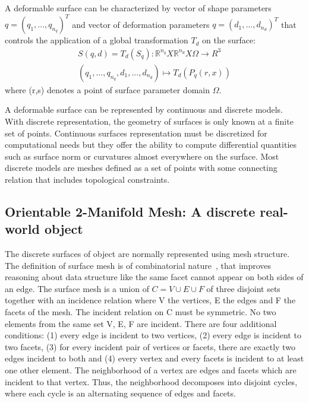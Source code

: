 \documentclass{InsightArticle}
\begin{document}
A deformable surface can be characterized by vector of shape parameters $q = ( q_1, ... , q_{n_q})^T$ and vector of deformation parameters $q = ( d_1, ... , d_{n_d})^T$ that controls the application of a global transformation $T_d$ 
on the surface:
\begin{equation}
\begin{split}
	S(q,d) = T_d(S_q) : \mathbb{R}^{n_q} X \mathbb{R}^{n_d} X \Omega \longrightarrow R^3 \\	
	(q_1, ... , q_{n_q}, d_1, ... , d_{n_d} ) \longmapsto T_d(P_q(r,x))	\end{split}
\end{equation}
where (r,s) denotes a point of surface parameter domain $\Omega$.

A deformable surface can be represented by continuous and discrete models. With discrete representation, the geometry of surfaces is only known at a finite set of points. Continuous surfaces representation must be discretized for computational needs but they offer the ability to compute differential quantities such as surface norm or curvatures almost everywhere on the surface. Most discrete models are meshes defined as a set of points with some connecting relation that includes topological constraints. 
\subsection{Orientable 2-Manifold Mesh: A discrete real-world object}
The discrete surfaces of object are normally represented using mesh structure. The definition of surface mesh is of combinatorial nature~\cite{Kettner1999}, that improves reasoning about data structure like the same facet cannot appear on both sides of an edge. The surface mesh is a union of $C = V \cup E \cup F$ of three disjoint sets together with an incidence relation where V the vertices, E the edges and F the facets of the mesh. The incident relation on C must be symmetric. No two elements from the same set V, E, F are incident. There are four additional conditions: (1) every edge is incident to two vertices, (2) every edge is incident to two facets, (3) for every incident pair of vertices or facets, there are exactly two edges incident to both and (4) every vertex and every facets is incident to at least one other element. The neighborhood of a vertex are edges and facets which are incident to that vertex. Thus, the neighborhood decomposes into disjoint cycles, where each cycle is an alternating sequence of edges and facets.
\end{document}
